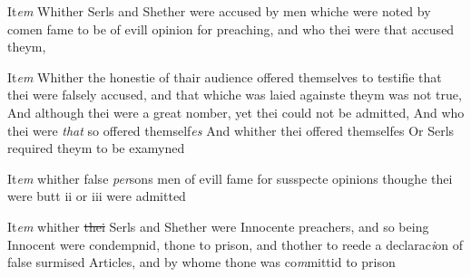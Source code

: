 \documentclass[12pt, a4paper]{book}
\begin{document}
            			
		\ifthenelse{\isodd{\thepage}}
		{\reversemarginpar}
		{\normalmarginpar}
		It\textit{em} Whither Serls and Shether were accused by men whiche were noted by comen fame to be of evill opinion for preaching, and who  thei were that accused theym,
            		
            		
            			
				\marginpar[\vspace{0.5cm}{\textcolor{Gray}{7}}]{}
			
            			
		\ifthenelse{\isodd{\thepage}}
		{\reversemarginpar}
		{\normalmarginpar}
		It\textit{em} Whither the honestie of thair audience offered themselves to testifie that thei were falsely accused, and that whiche was laied againste theym was not true, And although thei were a great nomber, yet thei
			 could not be admitted, And who thei were \textit{that} so offered themself\textit{es}
               And whither thei offered themselfes
			 Or Serls required theym to be examyned
            		
            		
            			
				\marginpar[\vspace{0.5cm}{\textcolor{Gray}{8}}]{}
			
            			
		\ifthenelse{\isodd{\thepage}}
		{\reversemarginpar}
		{\normalmarginpar}
		It\textit{em} whither false \textit{per}sons men of evill fame for susspecte opinions thoughe thei were butt ii or iii were admitted
            		
            		
            			
				\marginpar[\vspace{0.5cm}{\textcolor{Gray}{9}}]{}
			
            			
		\ifthenelse{\isodd{\thepage}}
		{\reversemarginpar}
		{\normalmarginpar}
		It\textit{em} whither \sout{thei }
               Serls and Shether
			 were Innocente preachers, and so being Innocent were condempnid, thone to prison, and thother to reede a declarac\textit{i}on of false surmised Articles, and by whome thone was co\textit{m}mittid to prison
            		
            		
            				
				\marginpar[\vspace{0.5cm}{\textcolor{Gray}{10}}]{}
			
\end{document}
